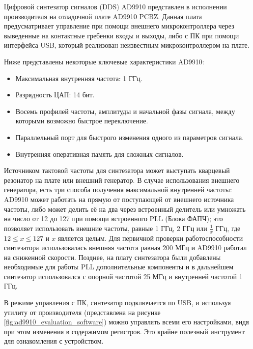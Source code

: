 \documentclass[rusmathsym, eqnumwithinsec, amspack, hyperref]{bomgost}
\begin{document}
Цифровой синтезатор сигналов (DDS) AD9910 представлен в исполнении производителя на отладочной плате AD9910 PCBZ. Данная плата предусматривает управление при помощи внешнего микроконтроллера через выведенные на контактные гребенки входы и выходы, либо с ПК при помощи интерфейса USB, который реализован неизвестным микроконтроллером на плате.

Ниже представлены некоторые ключевые характеристики AD9910:

\begin{itemize}
	\item Максимальная внутренняя частота: 1 ГГц.
	\item Разрядность ЦАП: 14 бит.
	\item Восемь профилей частоты, амплитуды и начальной фазы сигнала, между которыми возможно быстрое переключение.
	\item Параллельный порт для быстрого изменения одного из параметров сигнала.
	\item Внутренняя оперативная память для сложных сигналов.
\end{itemize}

Источником тактовой частоты для синтезатора может выступать кварцевый резонатор на плате или внешний генератор. В случае использования внешнего генератора, есть три способа получения максимальной внутренней частоты: AD9910 может работать на прямую от поступающей от внешнего источника частоты, либо может делить её на два через встроенный делитель или умножать на число от 12 до 127 при помощи встроенного PLL (Блока ФАПЧ); это позволяет использовать внешние частоты, равные 1 ГГц, 2 ГГц или $\frac{1}{x}$ ГГц, где $12 \leq x \leq 127$ и $x$ является целым. Для первичной проверки работоспособности синтезатора использовалась внешняя частота равная 200 МГц и AD9910 работал на сниженной скорости. Позднее, на плату синтезатора были добавлены необходимые для работы PLL дополнительные компоненты и в дальнейшем синтезатор использовался с опорной частотой 25 МГц и внутренней частотой 1 ГГц.

В режиме управления с ПК, синтезатор подключается по USB, и используя утилиту от производителя (представлена на рисунке \ref{fig:ad9910_evaluation_software}) можно управлять всеми его настройками, видя при этом изменения в содержимом регистров. Это крайне полезный инструмент для ознакомления с устройством.
\end{document}

